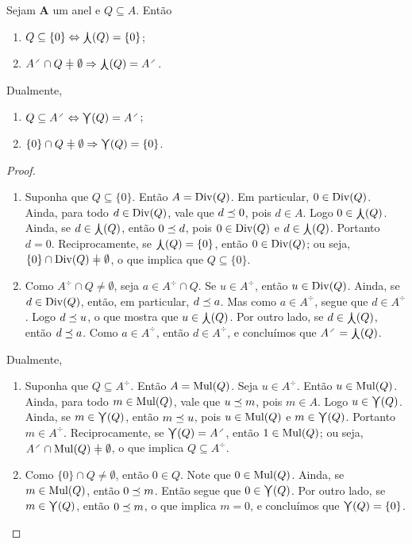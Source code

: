 \begin{proposition}
Sejam $\bm A$ um anel e $Q \subseteq A$. Então
	\begin{enumerate}
	\item $Q \subseteq \{0\} \Leftrightarrow \mathop{\bigcurlywedge}(Q) = \{0\}$;
	\item $A^{\div} \cap Q \neq \emptyset \Rightarrow \mdc(Q) = A^{\div}$.
	\end{enumerate}

	Dualmente,
	\begin{enumerate}
	\item $Q \subseteq A^{\div} \Leftrightarrow \mmc(Q) = A^{\div}$;
	\item $\{0\} \cap Q \neq \emptyset \Rightarrow \mmc(Q) = \{0\}$.
	\end{enumerate}
\end{proposition}
\begin{proof}
	\begin{enumerate}
	\item Suponha que $Q \subseteq \{0\}$. Então $A = \operatorname{Div}(Q)$. Em particular, $0 \in \operatorname{Div}(Q)$. Ainda, para todo $d \in \operatorname{Div}(Q)$, vale que $d \preceq 0$, pois $d \in A$. Logo $0 \in \mathop{\bigcurlywedge}(Q)$. Ainda, se $d \in \mathop{\bigcurlywedge}(Q)$, então $0 \preceq d$, pois $0 \in \operatorname{Div}(Q)$ e $d \in \mathop{\bigcurlywedge}(Q)$. Portanto $d=0$. Reciprocamente, se $\mathop{\bigcurlywedge}(Q)=\{0\}$, então $0 \in \operatorname{Div}(Q)$; ou seja, $\{0\} \cap \divv(Q) \neq \emptyset$, o que implica que $Q \subseteq \{0\}$.

	\item Como $A^{\div} \cap Q \neq \emptyset$, seja $a \in A^{\div} \cap Q$. Se $u \in A^{\div}$, então $u \in \operatorname{Div}(Q)$. Ainda, se $d \in \operatorname{Div}(Q)$, então, em particular, $d \preceq a$. Mas como $a \in A^{\div}$, segue que $d \in A^{\div}$. Logo $d \preceq u$, o que mostra que $u \in \mathop{\bigcurlywedge}(Q)$. Por outro lado, se $d \in \mathop{\bigcurlywedge}(Q)$, então $d \preceq a$. Como $a \in A^{\div}$, então $d \in A^{\div}$, e concluímos que $A^{\div}=\mdc(Q)$.
	\end{enumerate}

Dualmente,
	\begin{enumerate}
	\item Suponha que $Q \subseteq A^{\div}$. Então $A = \operatorname{Mul}(Q)$. Seja $u \in A^{\div}$. Então $u \in \operatorname{Mul}(Q)$. Ainda, para todo $m \in \operatorname{Mul}(Q)$, vale que $u \preceq m$, pois $m \in A$. Logo $u \in \mathop{\bigcurlyvee}(Q)$. Ainda, se $m \in \mathop{\bigcurlyvee}(Q)$, então $m \preceq u$, pois $u \in \operatorname{Mul}(Q)$ e $m \in \mathop{\bigcurlyvee}(Q)$. Portanto $m \in A^{\div}$. Reciprocamente, se $\mmc(Q)=A^{\div}$, então $1 \in \operatorname{Mul}(Q)$; ou seja, $A^{\div} \cap \mul(Q) \neq \emptyset$, o que implica $Q \subseteq A^{\div}$.

	\item Como $\{0\} \cap Q \neq \emptyset$, então $0 \in Q$. Note que $0 \in \operatorname{Mul}(Q)$. Ainda, se $m \in \operatorname{Mul}(Q)$, então $0 \preceq m$. Então segue que $0 \in \mathop{\bigcurlyvee}(Q)$. Por outro lado, se $m \in \mathop{\bigcurlyvee}(Q)$, então $0 \preceq m$, o que implica $m=0$, e concluímos que $\mathop{\bigcurlyvee}(Q) = \{0\}$.
	\qedhere
	\end{enumerate}
\end{proof}

